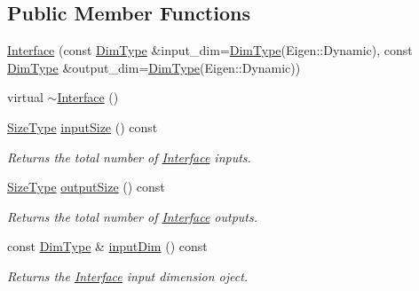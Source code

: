 \subsection*{Public Member Functions}
\begin{DoxyCompactItemize}
\item 
\hyperlink{classffnn_1_1layer_1_1internal_1_1_interface_aa99ab267db32eb48f2a3f9a2b76a2412}{Interface} (const \hyperlink{classffnn_1_1layer_1_1internal_1_1_interface_a8d121d0103f254b51e48f7b20a17681f}{Dim\-Type} \&input\-\_\-dim=\hyperlink{classffnn_1_1layer_1_1internal_1_1_interface_a8d121d0103f254b51e48f7b20a17681f}{Dim\-Type}(Eigen\-::\-Dynamic), const \hyperlink{classffnn_1_1layer_1_1internal_1_1_interface_a8d121d0103f254b51e48f7b20a17681f}{Dim\-Type} \&output\-\_\-dim=\hyperlink{classffnn_1_1layer_1_1internal_1_1_interface_a8d121d0103f254b51e48f7b20a17681f}{Dim\-Type}(Eigen\-::\-Dynamic))
\item 
virtual \hyperlink{classffnn_1_1layer_1_1internal_1_1_interface_a87499fd55b6612a35a1af5b13b851a55}{$\sim$\-Interface} ()
\item 
\hyperlink{classffnn_1_1layer_1_1internal_1_1_interface_af0567642f60c65b5e87067226a54174b}{Size\-Type} \hyperlink{classffnn_1_1layer_1_1internal_1_1_interface_a6de2e5a7e17c266f52d695ccf8e0b379}{input\-Size} () const 
\begin{DoxyCompactList}\small\item\em Returns the total number of \hyperlink{classffnn_1_1layer_1_1internal_1_1_interface}{Interface} inputs. \end{DoxyCompactList}\item 
\hyperlink{classffnn_1_1layer_1_1internal_1_1_interface_af0567642f60c65b5e87067226a54174b}{Size\-Type} \hyperlink{classffnn_1_1layer_1_1internal_1_1_interface_a3578b4137e24bd8992cdc8dd6def0745}{output\-Size} () const 
\begin{DoxyCompactList}\small\item\em Returns the total number of \hyperlink{classffnn_1_1layer_1_1internal_1_1_interface}{Interface} outputs. \end{DoxyCompactList}\item 
const \hyperlink{classffnn_1_1layer_1_1internal_1_1_interface_a8d121d0103f254b51e48f7b20a17681f}{Dim\-Type} \& \hyperlink{classffnn_1_1layer_1_1internal_1_1_interface_a9b437482b1478c0b8fc492dd480908ea}{input\-Dim} () const 
\begin{DoxyCompactList}\small\item\em Returns the \hyperlink{classffnn_1_1layer_1_1internal_1_1_interface}{Interface} input dimension oject. \end{DoxyCompactList}\item 

\end{DoxyCompactItemize}
